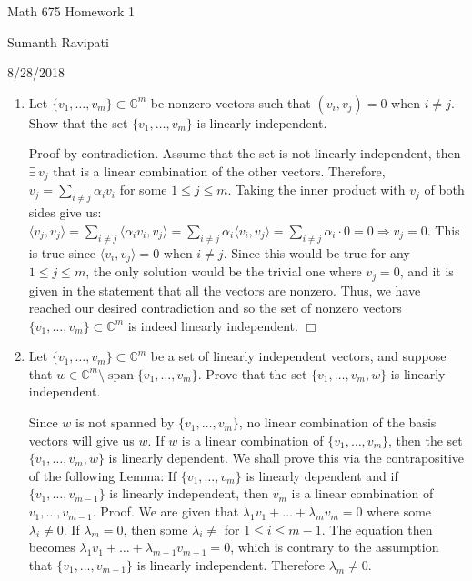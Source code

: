 \documentclass[12pt,letterpaper,reqno]{amsart}
\newcommand{\C}{\mathbb C}
\begin{document}
\thispagestyle{empty}
\centerline{\Large Math 675 Homework 1}
\centerline{Sumanth Ravipati}
\centerline{8/28/2018}
\vspace{.25in}

\begin{enumerate}[1.]
\item Let $\{v_1, \ldots, v_m\}\subset \C^m$ be nonzero vectors such that $(v_i, v_j)=0$ when $i\neq j$. Show that the set $\{v_1, \ldots, v_m\}$ is linearly independent.
\begin{flushleft}
Proof by contradiction. Assume that the set is not linearly independent, then $\exists \, v_j$ that is a linear combination of the other vectors. Therefore, $v_j = \sum_{i\not=j}\alpha_i v_i$ for some $1 \leq j \leq m$. Taking the inner product with $v_j$ of both sides give us: $\langle v_j, v_j \rangle = \sum_{i\not=j}\langle \alpha_i v_i, v_j \rangle = \sum_{i\not=j}\alpha_i \langle v_i, v_j \rangle = \sum_{i\not=j}\alpha_i \cdot 0 = 0 \Rightarrow v_j = 0$. This is true since $\langle v_i, v_j \rangle =0$ when $i\neq j$. Since this would be true for any $1 \leq j \leq m$, the only solution would be the trivial one where $v_j = 0$, and it is given in the statement that all the vectors are nonzero. Thus, we have reached our desired contradiction and so the set of nonzero vectors $\{v_1, \ldots, v_m\}\subset \C^m$ is indeed linearly independent. $\Box$
\end{flushleft}
\item Let $\{v_1, \ldots, v_m\}\subset \C^m$ be a set of linearly independent vectors, and suppose that $w\in \C^m\setminus \operatorname{span}\{v_1, \ldots, v_m\}$.  Prove that the set $\{v_1, \ldots, v_m, w\}$ is linearly independent.
\begin{flushleft}
Since $w$ is not spanned by $\{v_1, \ldots, v_m\}$, no linear combination of the basis vectors will give us $w$. If $w$ is a linear combination of $\{v_1, \ldots, v_m\}$, then the set $\{v_1, \ldots, v_m, w\}$ is linearly dependent. We shall prove this via the contrapositive of the following Lemma: \newline
If $\{v_1, \ldots, v_m\}$ is linearly dependent and if $\{v_1, \ldots, v_{m-1}\}$ is linearly independent, then $v_m$ is a linear combination of $v_1, \ldots, v_{m-1}$. \newline
Proof. We are given that $\lambda_1v_1 + \ldots + \lambda_m v_m = 0$ where some $\lambda_i \not= 0$. If $\lambda_m = 0$, then some $\lambda_i \not=$ for $1 \leq i \leq m - 1$. The equation then becomes $\lambda_1v_1 + \ldots + \lambda_{m-1} v_{m-1} = 0$, which is contrary to the assumption that $\{v_1, \ldots, v_{m-1}\}$ is linearly independent. Therefore $\lambda_m \not= 0$. \newline

\end{flushleft}
\end{enumerate}
\end{document}
